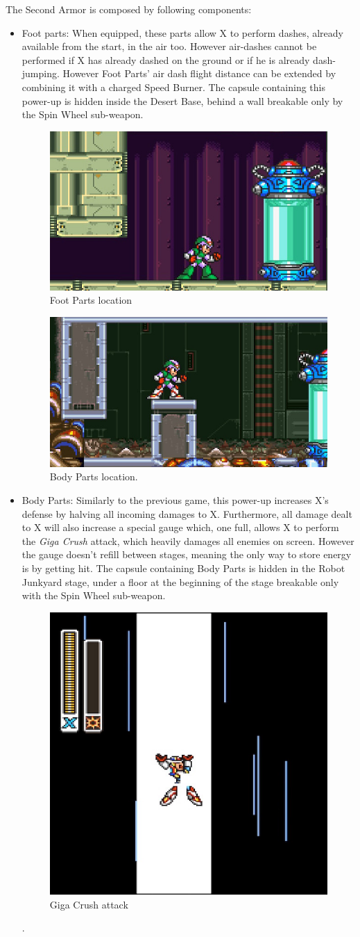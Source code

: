 The Second Armor is composed by following components:
\begin{itemize}
	\item Foot parts: When equipped, these parts allow X to perform dashes, already available from the start, in the air too. However air-dashes cannot be performed if X has already dashed on the ground or if he is already dash-jumping. However Foot Parts' air dash flight distance can be extended by combining it with a charged Speed Burner. The capsule containing this power-up is hidden inside the Desert Base, behind a wall breakable only by the Spin Wheel sub-weapon.
	\begin{figure}[htp]
		\centering
		\includegraphics[width=0.4\linewidth]{figures/X2/Overdrive_ostrich/Ostrich_capsule.jpg}	
		\caption{Foot Parts location}
	\end{figure}	
	
	
	\begin{figure}[htp]
		\centering
		\includegraphics[width=0.4\linewidth]{figures/X2/Morph_moth/Moth_capsule_2.jpg}
		\caption{Body Parts location.}
	\end{figure}
	\item Body Parts: Similarly to the previous game, this power-up increases X's defense by halving all incoming damages to X. Furthermore, all damage dealt to X will also increase a special gauge which, one full, allows X to perform the \textit{Giga Crush} attack, which heavily damages all enemies on screen. 
	However the gauge doesn't refill between stages, meaning the only way to store energy is by getting hit. The capsule containing Body Parts is hidden in the Robot Junkyard stage, under a floor at the beginning of the stage breakable only with the Spin Wheel sub-weapon.
	\begin{figure}
		\centering
		\includegraphics[width=0.4\linewidth]{figures/X2/weapons/G_crush_1.png}
		\caption{Giga Crush attack}
	\end{figure}.
	

\end{itemize}
